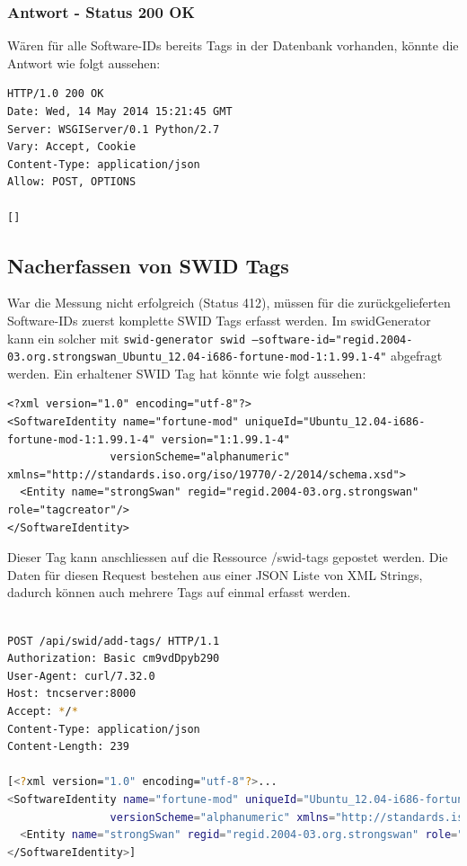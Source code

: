 \documentclass[10pt,a4paper]{scrartcl}
\begin{document}
\subsubsection{Antwort - Status 200 OK}
Wären für alle Software-IDs bereits Tags in der Datenbank vorhanden, könnte die Antwort wie folgt aussehen:
\begin{lstlisting}
HTTP/1.0 200 OK
Date: Wed, 14 May 2014 15:21:45 GMT
Server: WSGIServer/0.1 Python/2.7
Vary: Accept, Cookie
Content-Type: application/json
Allow: POST, OPTIONS

[]
\end{lstlisting}

\subsection{Nacherfassen von SWID Tags}
War die Messung nicht erfolgreich (Status 412), müssen für die zurückgelieferten Software-IDs zuerst komplette SWID Tags erfasst werden.
Im swidGenerator kann ein solcher mit \texttt{swid-generator swid --software-id="regid.2004-03.org.strongswan\_Ubuntu\_12.04-i686-fortune-mod-1:1.99.1-4"} abgefragt werden.
Ein erhaltener SWID Tag hat könnte wie folgt aussehen:

\lstset{language=XML}
\begin{lstlisting}
<?xml version="1.0" encoding="utf-8"?>
<SoftwareIdentity name="fortune-mod" uniqueId="Ubuntu_12.04-i686-fortune-mod-1:1.99.1-4" version="1:1.99.1-4"
	   			versionScheme="alphanumeric" xmlns="http://standards.iso.org/iso/19770/-2/2014/schema.xsd">
  <Entity name="strongSwan" regid="regid.2004-03.org.strongswan" role="tagcreator"/>
</SoftwareIdentity>
\end{lstlisting}

Dieser Tag kann anschliessen auf die Ressource /swid-tags gepostet werden. Die Daten für diesen Request bestehen aus einer JSON Liste von XML Strings, dadurch können auch mehrere Tags auf einmal erfasst werden.

\begin{lstlisting}[language=BASH]

POST /api/swid/add-tags/ HTTP/1.1
Authorization: Basic cm9vdDpyb290
User-Agent: curl/7.32.0
Host: tncserver:8000
Accept: */*
Content-Type: application/json
Content-Length: 239

[<?xml version="1.0" encoding="utf-8"?>...
<SoftwareIdentity name="fortune-mod" uniqueId="Ubuntu_12.04-i686-fortune-mod-1:1.99.1-4" version="1:1.99.1-4"
	   			versionScheme="alphanumeric" xmlns="http://standards.iso.org/iso/19770/-2/2014/schema.xsd">
  <Entity name="strongSwan" regid="regid.2004-03.org.strongswan" role="tagcreator"/>
</SoftwareIdentity>]
\end{lstlisting}
\end{document}
